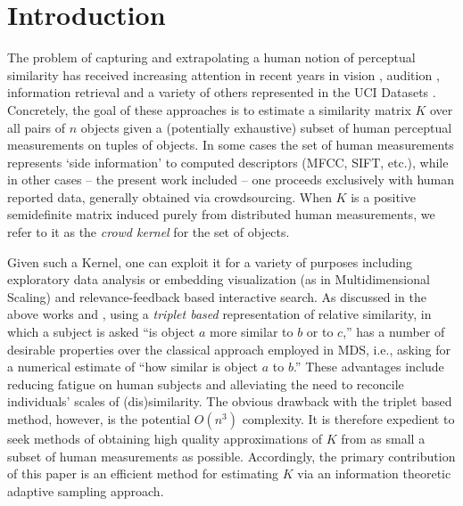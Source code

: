 \documentclass{article}
\begin{document}
\section{Introduction}
The problem of capturing and extrapolating a human notion of
perceptual similarity has received increasing attention in recent
years in vision \cite{Agarwal07}, audition \cite{McFee09}, information
retrieval \cite{Schultz03} and a variety of others represented in the
UCI Datasets \cite{Xing02,Huang10}.  Concretely, the goal of these
approaches is to estimate a similarity matrix $K$ over all pairs of
$n$ objects given a (potentially exhaustive) subset of human
perceptual measurements on tuples of objects.  In some cases the set
of human measurements represents `side information' to computed
descriptors (MFCC, SIFT, etc.), while in other cases -- the present
work included -- one proceeds exclusively with human reported data,
generally obtained via crowdsourcing.  When $K$ is a positive
semidefinite matrix induced purely from distributed human
measurements, we refer to it as the {\em crowd kernel} for the set of
objects.

Given such a Kernel, one can exploit it for a variety of purposes
including exploratory data analysis or embedding visualization (as in
Multidimensional Scaling) and relevance-feedback based interactive
search.  As discussed in the above works and \cite{Kendall90}, using a
{\em triplet based} representation of relative similarity, in which a
subject is asked ``is object $a$ more similar to $b$ or to $c$,'' has
a number of desirable properties over the classical approach employed
in MDS, i.e., asking for a numerical estimate of ``how similar is
object $a$ to $b$.''  These advantages include reducing fatigue on
human subjects and alleviating the need to reconcile individuals'
scales of (dis)similarity.  The obvious drawback with the triplet
based method, however, is the potential $O(n^3)$ complexity.  It is
therefore expedient to seek methods of obtaining high quality
approximations of $K$ from as small a subset of human measurements as
possible.   Accordingly, the primary contribution of this paper is an efficient method for estimating $K$ via an information theoretic adaptive sampling approach.
\end{document}
